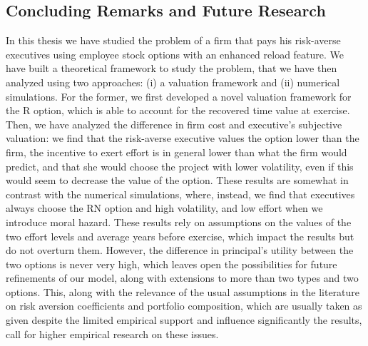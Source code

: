 \subsection{Concluding Remarks and Future Research}
In this thesis we have studied the problem of a firm that pays his risk-averse executives using employee stock options with an enhanced reload feature. We have built a theoretical framework to study the problem, that we have then analyzed using two approaches: (i) a valuation framework and (ii) numerical simulations. 
For the former, we first developed a novel valuation framework for the R option, which is able to account for the recovered time value at exercise. Then, we have analyzed the difference in firm cost and executive's subjective valuation: we find that the risk-averse executive values the option lower than the firm, the incentive to exert effort is in general lower than what the firm would predict, and that she would choose the project with lower volatility, even if this would seem to decrease the value of the option.
These results are somewhat in contrast with the numerical simulations, where, instead, we find that executives always choose the RN option and high volatility, and low effort when we introduce moral hazard. These results rely on assumptions on the values of the two effort levels and average years before exercise, which impact the results but do not overturn them. However, the difference in principal's utility between the two options is never very high, which leaves open the possibilities for future refinements of our model, along with extensions to more than two types and two options. 
This, along with the relevance of the usual assumptions in the literature on risk aversion coefficients and portfolio composition, which are usually taken as given despite the limited empirical support and influence significantly the results, call for higher empirical research on these issues.